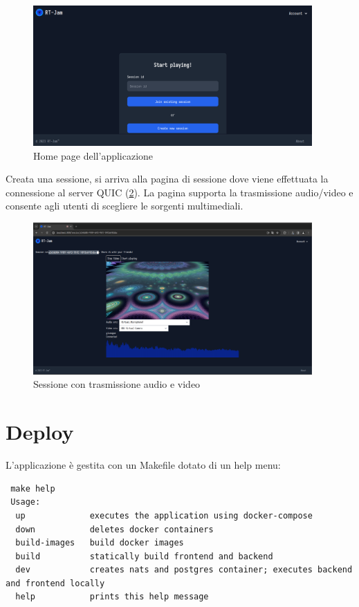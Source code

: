 \documentclass{article}
\begin{document}
\begin{figure}[h]
  \begin{center}
    \includegraphics[width=0.95\textwidth]{figures/home_page.png}
  \end{center}
  \caption{Home page dell'applicazione}\label{fig:home-page}
\end{figure}

Creata una sessione, si arriva alla pagina di sessione dove viene effettuata la connessione 
al server QUIC (\cref{fig:session2}). 
La pagina supporta la trasmissione audio/video e consente agli utenti di scegliere le 
sorgenti multimediali.


\begin{figure}[h]
  \begin{center}
    \includegraphics[width=0.95\textwidth]{figures/session2_page.png}
  \end{center}
  \caption{Sessione con trasmissione audio e video}\label{fig:session2}
\end{figure}


\clearpage
\section{Deploy}
L'applicazione è gestita con un Makefile dotato di un help menu:
\begin{verbatim}
 make help
 Usage:
  up             executes the application using docker-compose
  down           deletes docker containers
  build-images   build docker images
  build          statically build frontend and backend
  dev            creates nats and postgres container; executes backend and frontend locally
  help           prints this help message
\end{verbatim}
\end{document}

